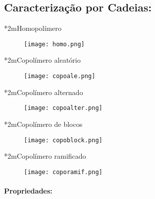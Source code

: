 \documentclass[\mainfilename]{subfiles}
\begin{document}
\begin{sectionBox}
    \subsection{Caracterização por Cadeias:}
    \begin{sectionBox}*2m{Homopolímero} %
        \begin{figure}\centering
            \texttt{[image: homo.png]}
        \end{figure}
    \end{sectionBox}
    \begin{multicols}{2}
        \begin{sectionBox}*2m{Copolímero aleatório} %
            \begin{figure}\centering
                \texttt{[image: copoale.png]}
            \end{figure}
        \end{sectionBox}
        \begin{sectionBox}*2m{Copolímero alternado} %
            \begin{figure}\centering
                \texttt{[image: copoalter.png]}
            \end{figure}
        \end{sectionBox}
        \begin{sectionBox}*2m{Copolímero de blocos} %
            \begin{figure}\centering
                \texttt{[image: copoblock.png]}
            \end{figure}
        \end{sectionBox}
        \begin{sectionBox}*2m{Copolímero ramificado} %
            \begin{figure}\centering
                \texttt{[image: coporamif.png]}
            \end{figure}
        \end{sectionBox}
    \end{multicols}

    \paragraph*{Propriedades:}


\end{sectionBox}
\end{document}
